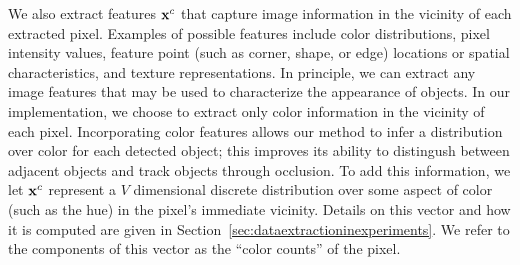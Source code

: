 \documentclass[twocolumn, final]{svjour3}
\begin{document}
We also extract features $\bold{x}^{c}$ that capture image information in the vicinity of each extracted pixel. Examples of possible features include color distributions, pixel intensity values, feature point (such as corner, shape, or edge) locations or spatial characteristics, and texture representations. In principle, we can extract any image features that may be used to characterize the appearance of objects. In our implementation, we choose to extract only color information in the vicinity of each pixel. Incorporating color features allows our method to infer a distribution over color for each detected object; this improves its ability to distingush between adjacent objects and track objects through occlusion. To add this information, we let $\bold{x}^{c}$ represent a $V$ dimensional discrete distribution over some aspect of color (such as the hue) in the pixel's immediate vicinity. Details on this vector and how it is computed are given in Section~\ref{sec:dataextractioninexperiments}. We refer to the components of this vector as the ``color counts'' of the pixel.




\end{document}

